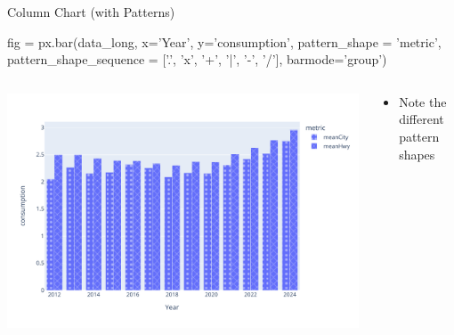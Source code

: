 \documentclass[ignorenonframetext,xcolor=x11names]{beamer}
\begin{document}
\begin{frame}[fragile]{Column Chart (with Patterns)}
\begin{pythoncode}
fig = px.bar(data_long, 
   x='Year', y='consumption', 
   pattern_shape = 'metric', 
   pattern_shape_sequence = ['.', 'x', '+', '|', '-', '/'],
   barmode='group')
\end{pythoncode}
\begin{columns}
\begin{column}{.75\textwidth}
  \includegraphics[width=\textwidth]{px.fuel.columnsPatterns.pdf}
\end{column}
\begin{column}{.35\textwidth}
\footnotesize
  \begin{itemize}
  \item Note the different pattern shapes
  \end{itemize}
\end{column}
\end{columns}
\end{frame}
\end{document}
